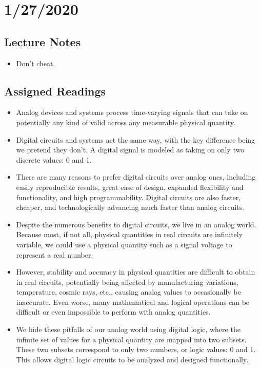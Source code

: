 \documentclass[10pt,a4paper]{article}
\author{Ben Miller}
\begin{document}
\tableofcontents
\pagebreak
\section{1/27/2020}
\subsection{Lecture Notes}
\begin{itemize}
\item Don't cheat. 
\end{itemize}
\subsection{Assigned Readings}
\begin{itemize}
\item Analog devices and systems process time-varying signals that can take on potentially any kind of valid across any measurable physical quantity. 
\item Digital circuits and systems act the same way, with the key difference being we pretend they don't. A digital signal is modeled as taking on only two discrete values: 0 and 1. 
\item There are many reasons to prefer digital circuits over analog ones, including easily reproducible results, great ease of design, expanded flexibility and functionality, and high programmability. Digital circuits are also faster, cheaper, and technologically advancing much faster than analog circuits. 
\item Despite the numerous benefits to digital circuits, we live in an analog world. Because most, if not all, physical quantities in real circuits are infinitely variable, we could use a physical quantity such as a signal voltage to represent a real number. 
\item However, stability and accuracy in physical quantities are difficult to obtain in real circuits, potentially being affected by manufacturing variations, temperature, cosmic rays, etc., causing analog values to occasionally be inaccurate. Even worse, many mathematical and logical operations can be difficult or even impossible to perform with analog quantities. 
\item We hide these pitfalls of our analog world using digital logic, where the infinite set of values for a physical quantity are mapped into two subsets. These two subsets correspond to only two numbers, or logic values: 0 and 1. This allows digital logic circuits to be analyzed and designed functionally. 

\end{itemize}
\end{document}
